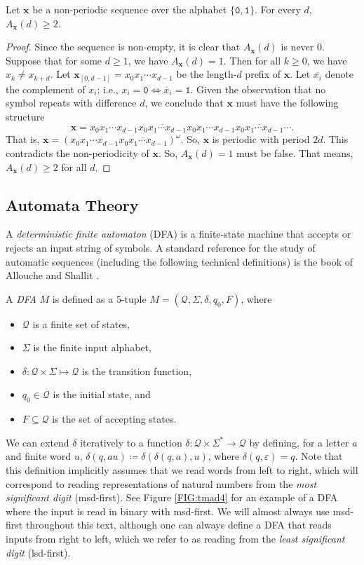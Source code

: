 \documentclass[10pt,a4paper,reqno]{amsart}
\newcommand{\bfx}{{\mathbf x}}
\begin{document}
\begin{lem}\label{adgeq2}
Let \(\bfx\) be a non-periodic sequence over the alphabet $\{\mathtt{0,1}\}$. For every $d$, $A_{\bfx}(d)\geq2$.
\end{lem}
\begin{proof}
Since the sequence is non-empty, it is clear that $A_\bfx(d)$ is never $0$. Suppose that for some $d \geq 1$, we have $A_\bfx(d)=1$. Then for all \(k \geq 0\), we have $x_k \neq x_{k+d}$. Let $\bfx_{[0,d-1]} = x_0x_1 \cdots x_{d-1}$ be the length-$d$ prefix of $\bfx$. Let $\overline{x_i}$ denote the complement of $x_i$; i.e., $x_i=\mathtt{0} \iff \overline{x}_i = \mathtt{1}$. Given the observation that no symbol repeats with difference \(d\), we conclude that \(\bfx\) must have the following structure
\[\bfx = x_0x_1\cdots x_{d-1}\overline{x_0x_1\cdots x_{d-1}} x_0x_1\cdots x_{d-1}\overline{x_0x_1\cdots x_{d-1}}\cdots.\]
That is, \(\bfx = (x_0x_1\cdots x_{d-1}\overline{x_0x_1\cdots x_{d-1}})^\omega\). So, $\bfx$ is periodic with period \(2d\). This contradicts the non-periodicity of \(\bfx\). So, \(A_\bfx(d)=1\) must be false. That means, $A_\bfx(d) \geq 2$ for all $d$.
\end{proof}


\subsection{Automata Theory}\label{SEC:aut}
A {\em deterministic finite automaton} (DFA) is a finite-state machine that accepts or rejects an input string of symbols. A standard reference for the study of automatic sequences (including the following technical definitions) is the book of Allouche and Shallit \cite{AS2003}.
\begin{definition} \label{dfadef}
A {\em DFA} $M$ is defined as a 5-tuple $M = (\mathcal{Q},\Sigma, \delta, q_0, F)$, where 
\begin{itemize}
    \item $\mathcal{Q}$ is a finite set of states,
    \item $\Sigma$ is the finite input alphabet,
    \item $\delta\colon\mathcal{Q}\times\Sigma \mapsto \mathcal{Q}$ is the transition function,
    \item $q_0\in \mathcal{Q}$ is the initial state, and
    \item $F\subseteq \mathcal{Q}$ is the set of accepting states.
\end{itemize}
\end{definition}
We can extend $\delta$ iteratively to a function $\delta \colon \mathcal{Q} \times \Sigma^* \to \mathcal{Q}$ by defining, for a letter $a$ and finite word $u$, $\delta(q,au)\coloneq \delta(\delta(q,a),u)$, where $\delta(q,\varepsilon) = q$. Note that this definition implicitly assumes that we read words from left to right, which will correspond to reading representations of natural numbers from the {\em most significant digit} (msd-first). See Figure \ref{FIG:tmad4} for an example of a DFA where the input is read in binary with msd-first. We will almost always use msd-first throughout this text, although one can always define a DFA that reads inputs from right to left, which we refer to as reading from the {\em least significant digit} (lsd-first).
\end{document}

